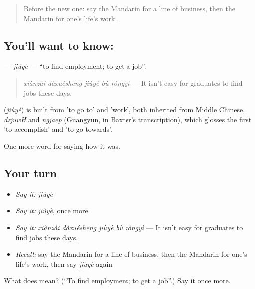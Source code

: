 \label{lesson:ZH-C487-jiuye}



\begin{quote}
Before the new one: say the Mandarin for a line of business, then the Mandarin for one's life's work.
\end{quote}

\subsection*{You'll want to know: }
\textbf{} — \emph{jiùyè} — \textquotedblleft{}to find employment; to get a job\textquotedblright{}.

\begin{quote}
\emph{xiànzài dàxuésheng jiùyè bù róngyì} — It isn't easy for graduates to find jobs these days.
\end{quote}

\begin{cousinweb}
\textbf{} (\emph{jiùyè}) is built from  'to go to' and  'work', both inherited from Middle Chinese, \emph{dzjuwH} and \emph{ngjaep} (Guangyun, in Baxter's transcription), which glosses the first 'to accomplish' and 'to go towards'.
\end{cousinweb}

\begin{grammarlens}[title={What you've built}]
One more word for saying how it was.
\end{grammarlens}

\subsection*{Your turn}
\begin{itemize}
\raggedright
  \item \emph{Say it:} \emph{jiùyè}
  \item \emph{Say it:} \emph{jiùyè}, once more
  \item \emph{Say it:} \emph{xiànzài dàxuésheng jiùyè bù róngyì} — It isn't easy for graduates to find jobs these days.
  \item \emph{Recall:} say the Mandarin for a line of business, then the Mandarin for one's life's work, then say \emph{jiùyè} again
\end{itemize}

\begin{tcolorbox}[breakable,colback=teal!4,colframe=teal!35!black,title={Before you move on}]
What does  mean? (\textquotedblleft{}To find employment; to get a job\textquotedblright{}.) Say it once more.
\end{tcolorbox}
